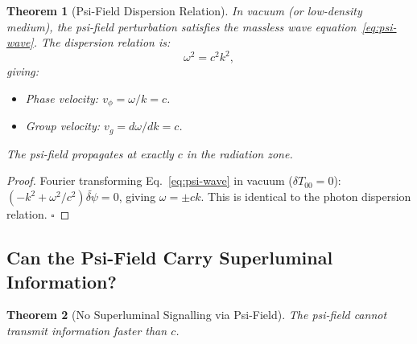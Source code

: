 \documentclass[aps,prd,twocolumn,superscriptaddress,nofootinbib]{revtex4-2}
\newtheorem{theorem}{Theorem}
\begin{document}
\begin{theorem}[Psi-Field Dispersion Relation]
\label{thm:dispersion}
In vacuum (or low-density medium), the psi-field perturbation satisfies
the massless wave equation~\eqref{eq:psi-wave}. The dispersion relation is:
\begin{equation}
\omega^2 = c^2 k^2,
\label{eq:dispersion}
\end{equation}
giving:
\begin{itemize}
\item Phase velocity: $v_\phi = \omega/k = c$.
\item Group velocity: $v_g = d\omega/dk = c$.
\end{itemize}
The psi-field propagates at exactly $c$ in the radiation zone.
\end{theorem}

\begin{proof}
Fourier transforming Eq.~\eqref{eq:psi-wave} in vacuum ($\delta T_{00} = 0$):
$(-k^2 + \omega^2/c^2)\tilde{\delta\psi} = 0$, giving $\omega = \pm ck$.
This is identical to the photon dispersion relation. $\square$
\end{proof}

\subsection{Can the Psi-Field Carry Superluminal Information?}

\begin{theorem}[No Superluminal Signalling via Psi-Field]
\label{thm:no-FTL}
The psi-field cannot transmit information faster than $c$.
\end{theorem}
\end{document}
